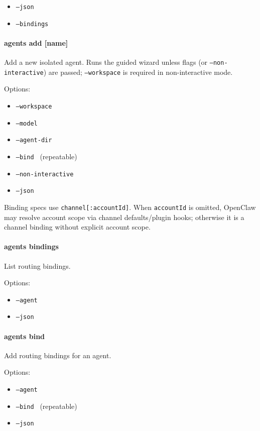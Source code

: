 \begin{itemize}
  \item \texttt{--json}
  \item \texttt{--bindings}
\end{itemize}


\paragraph{agents add [name]}


Add a new isolated agent. Runs the guided wizard unless flags (or \texttt{--non-interactive}) are passed; \texttt{--workspace} is required in non-interactive mode.

Options:

\begin{itemize}
  \item \texttt{--workspace }
  \item \texttt{--model }
  \item \texttt{--agent-dir }
  \item \texttt{--bind } (repeatable)
  \item \texttt{--non-interactive}
  \item \texttt{--json}
\end{itemize}


Binding specs use \texttt{channel[:accountId]}. When \texttt{accountId} is omitted, OpenClaw may resolve account scope via channel defaults/plugin hooks; otherwise it is a channel binding without explicit account scope.

\paragraph{agents bindings}


List routing bindings.

Options:

\begin{itemize}
  \item \texttt{--agent }
  \item \texttt{--json}
\end{itemize}


\paragraph{agents bind}


Add routing bindings for an agent.

Options:

\begin{itemize}
  \item \texttt{--agent }
  \item \texttt{--bind } (repeatable)
  \item \texttt{--json}
\end{itemize}


